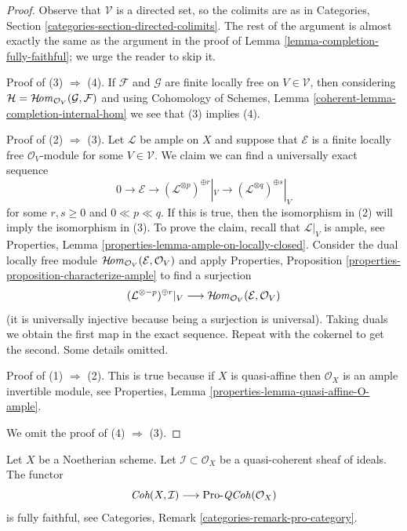 \begin{proof}
Observe that $\mathcal{V}$ is a directed set, so the colimits are
as in Categories, Section \ref{categories-section-directed-colimits}.
The rest of the argument is almost exactly the same as the argument
in the proof of Lemma \ref{lemma-completion-fully-faithful}; we urge
the reader to skip it.

\medskip\noindent
Proof of (3) $\Rightarrow$ (4). If $\mathcal{F}$ and $\mathcal{G}$
are finite locally free on $V \in \mathcal{V}$, then considering
$\mathcal{H} = \mathop{\mathcal{H}\!\mathit{om}}\nolimits_{\mathcal{O}_V}(\mathcal{G}, \mathcal{F})$
and using Cohomology of Schemes, Lemma
\ref{coherent-lemma-completion-internal-hom}
we see that (3) implies (4).

\medskip\noindent
Proof of (2) $\Rightarrow$ (3). Let $\mathcal{L}$ be ample
on $X$ and suppose that $\mathcal{E}$ is a
finite locally free $\mathcal{O}_V$-module
for some $V \in \mathcal{V}$.
We claim we can find a universally exact sequence
$$
0 \to \mathcal{E} \to
(\mathcal{L}^{\otimes p})^{\oplus r}|_{V} \to
(\mathcal{L}^{\otimes q})^{\oplus s}|_{V}
$$
for some $r, s \geq 0$ and $0 \ll p \ll q$. If this is true, then
the isomorphism in (2) will imply the isomorphism in (3).
To prove the claim, recall that $\mathcal{L}|_V$ is ample, see
Properties, Lemma \ref{properties-lemma-ample-on-locally-closed}.
Consider the dual locally free module
$\mathop{\mathcal{H}\!\mathit{om}}\nolimits_{\mathcal{O}_V}(\mathcal{E}, \mathcal{O}_V)$
and apply
Properties, Proposition \ref{properties-proposition-characterize-ample}
to find a surjection
$$
(\mathcal{L}^{\otimes -p})^{\oplus r}|_V \longrightarrow
\mathop{\mathcal{H}\!\mathit{om}}\nolimits_{\mathcal{O}_V}(\mathcal{E}, \mathcal{O}_V)
$$
(it is universally injective because being a surjection is universal).
Taking duals we obtain the first map in the exact sequence.
Repeat with the cokernel to get the second. Some details omitted.

\medskip\noindent
Proof of (1) $\Rightarrow$ (2). This is true because if $X$ is quasi-affine
then $\mathcal{O}_X$ is an ample invertible module, see
Properties, Lemma \ref{properties-lemma-quasi-affine-O-ample}.

\medskip\noindent
We omit the proof of (4) $\Rightarrow$ (3).
\end{proof}

\begin{lemma}
\label{lemma-recognize-formal-coherent-modules}
Let $X$ be a Noetherian scheme. Let $\mathcal{I} \subset \mathcal{O}_X$
be a quasi-coherent sheaf of ideals. The functor
$$
\textit{Coh}(X, \mathcal{I}) \longrightarrow \text{Pro-}\mathit{QCoh}(\mathcal{O}_X)
$$
is fully faithful, see Categories, Remark \ref{categories-remark-pro-category}.
\end{lemma}

